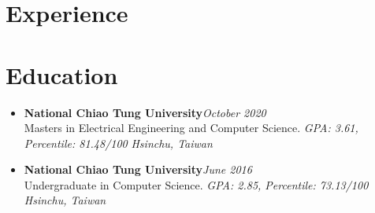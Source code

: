 \section{Experience}
\fi
\section{\sectionheading Education}

\begin{itemize}[leftmargin=0pt, label={}]%

\item{
{\sectionheading\large{\textbf{National Chiao Tung University}}}\hfill {\sectionheading\small{\textit{October 2020}}}\\
{\sectionheading\small{Masters in Electrical Engineering and Computer Science.}}
{\sectionheading\small{\textit{GPA: 3.61, Percentile: 81.48/100}}}
\hfill{\sectionheading\small{\textit{Hsinchu, Taiwan}}}

}

\item{
{\sectionheading\large{\textbf{National Chiao Tung University}}}\hfill {\sectionheading\small{\textit{June 2016}}}\\
{\sectionheading\small{Undergraduate in Computer Science.}}
{\sectionheading\small{\textit{GPA: 2.85, Percentile: 73.13/100}}}
\hfill{\sectionheading\small{\textit{Hsinchu, Taiwan}}}

}

\end{itemize}
